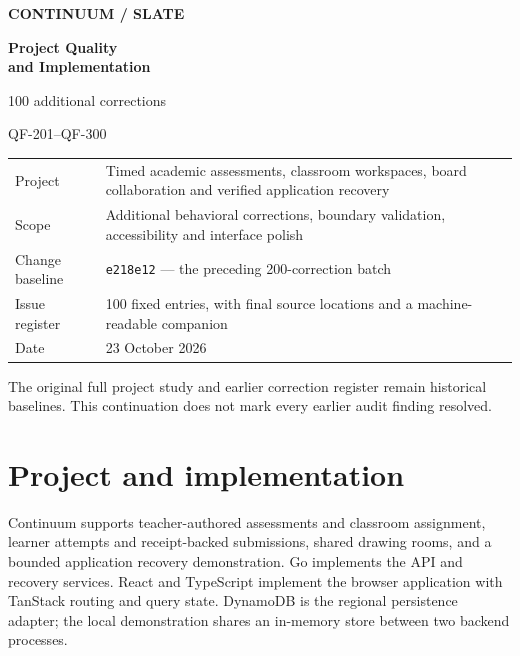 \documentclass[10pt,a4paper]{article}
\begin{document}
\begin{titlepage}
\vspace*{14mm}
{\small\bfseries\color{accent}CONTINUUM / SLATE\par}
\vspace{16mm}
{\Huge\bfseries\color{ink}Project Quality\\[4pt]and Implementation\par}
\vspace{9mm}
{\Large 100 additional corrections\par}
\vspace{4mm}
{\large QF-201--QF-300\par}
\vspace{18mm}
\vspace{14mm}
\begin{tabularx}{\linewidth}{@{}p{36mm}X@{}}
\toprule
Project & Timed academic assessments, classroom workspaces, board collaboration and verified application recovery\\
Scope & Additional behavioral corrections, boundary validation, accessibility and interface polish\\
Change baseline & \texttt{e218e12} --- the preceding 200-correction batch\\
Issue register & 100 fixed entries, with final source locations and a machine-readable companion\\
Date & 23 October 2026\\
\bottomrule
\end{tabularx}
\vfill
{\small\color{muted}The original full project study and earlier correction register remain historical baselines. This continuation does not mark every earlier audit finding resolved.}
\end{titlepage}

\section{Project and implementation}
Continuum supports teacher-authored assessments and classroom assignment, learner attempts and receipt-backed submissions, shared drawing rooms, and a bounded application recovery demonstration. Go implements the API and recovery services. React and TypeScript implement the browser application with TanStack routing and query state. DynamoDB is the regional persistence adapter; the local demonstration shares an in-memory store between two backend processes.
\end{document}
